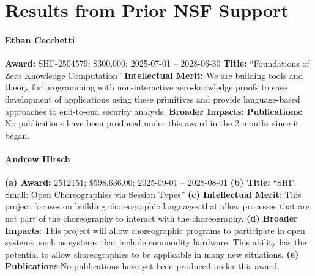 \section{Results from Prior NSF Support}
\label{sec:prior_results}

\paragraph{Ethan Cecchetti}
\textbf{Award:} SHF-2504579; \$300,000; 2025-07-01 -- 2028-06-30
\textbf{Title:} ``Foundations of Zero Knowledge Computation''
\textbf{Intellectual Merit:} We are building tools and theory for programming with non-interactive zero-knowledge proofs
to ease development of applications using these primitives and provide language-based approaches to end-to-end security analysis.
\textbf{Broader Impacts:} 
\textbf{Publications:} No publications have been produced under this award in the 2 months since it began.

\paragraph{Andrew Hirsch}
\textbf{(a) Award:} 2512151; \$598,636.00; 2025-09-01 -- 2028-08-01
\textbf{(b) Title:} ``SHF: Small: Open Choreographies via Session Types''
\textbf{(c) Intellectual Merit}: This project focuses on building choreographic languages that allow processes that are not part of the choreography to interact with the choreography.
\textbf{(d) Broader Impacts}: This project will allow choreographic programs to participate in open systems, such as systems that include commodity hardware.
This ability has the potential to allow choreographies to be applicable in many new situations.
\textbf{(e) Publications}:No publications have yet been produced under this award.


